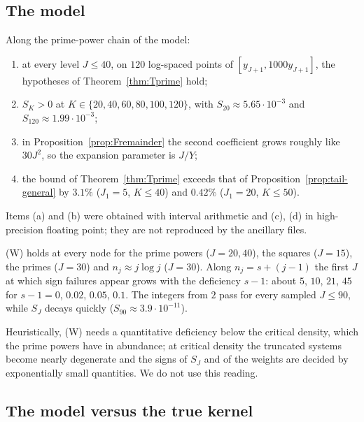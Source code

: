 \subsection{The model}\label{ssec:obs-model}

\begin{observation}\label{obs:toytail-data}
Along the prime-power chain of the model:
\begin{enumerate}[label=\textup{(\alph*)}]
\item at every level $J\le40$, on $120$ log-spaced points of $[y_{J+1},1000y_{J+1}]$, the hypotheses of
Theorem~\ref{thm:Tprime} hold;
\item $S_K>0$ at $K\in\{20,40,60,80,100,120\}$, with $S_{20}\approx5.65\cdot10^{-3}$ and $S_{120}\approx1.99\cdot10^{-3}$;
\item in Proposition~\ref{prop:Fremainder} the second coefficient grows roughly like $30J^2$, so the expansion parameter is
$J/Y$;
\item the bound of Theorem~\ref{thm:Tprime} exceeds that of Proposition~\ref{prop:tail-general} by $3.1\%$ ($J_1=5$,
$K\le40$) and $0.42\%$ ($J_1=20$, $K\le50$).
\end{enumerate}
Items (a) and (b) were obtained with interval arithmetic and (c), (d) in high-precision floating point; they are not
reproduced by the ancillary files.
\end{observation}

\begin{observation}\label{obs:W-PP}
\textup{(W)} holds at every node for the prime powers ($J=20,40$), the squares ($J=15$), the primes ($J=30$) and
$n_j\approx j\log j$ ($J=30$). Along $n_j=s+(j-1)$ the first $J$ at which sign failures appear grows with the deficiency
$s-1$: about $5$, $10$, $21$, $45$ for $s-1=0$, $0.02$, $0.05$, $0.1$. The integers from $2$ pass for every sampled
$J\le90$, while $S_J$ decays quickly ($S_{90}\approx3.9\cdot10^{-11}$).
\end{observation}

Heuristically, (W) needs a quantitative deficiency below the critical density, which the prime powers have in abundance;
at critical density the truncated systems become nearly degenerate and the signs of $S_J$ and of the weights are decided by
exponentially small quantities. We do not use this reading.

\subsection{The model versus the true kernel}\label{ssec:toy-true}

